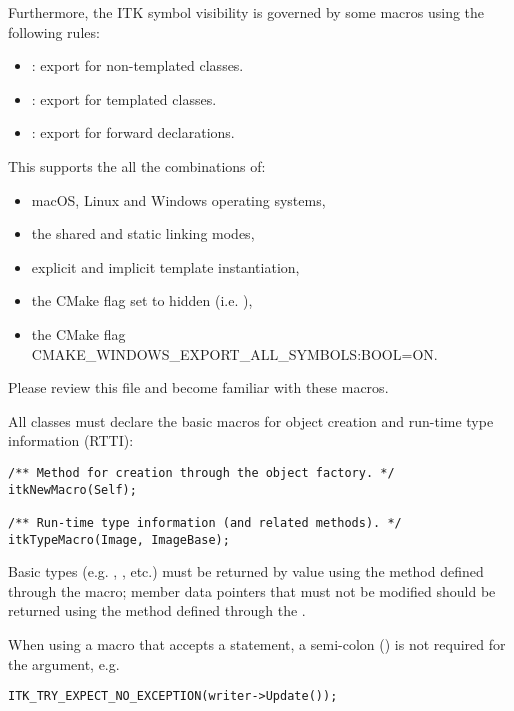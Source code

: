 Furthermore, the ITK symbol visibility is governed by some macros using the
following rules:
\begin{itemize}
\item {}: export for non-templated classes.
\item {}: export for templated classes.
\item {}: export for forward declarations.
\end{itemize}

This supports the all the combinations of:
\begin{itemize}
\item macOS, Linux and Windows operating systems,
\item the shared   and  static
linking modes,
\item explicit and implicit template instantiation,
\item the CMake  flag set to hidden (i.e.
),
\item the CMake flag {CMAKE\_WINDOWS\_EXPORT\_ALL\_SYMBOLS:BOOL=ON}.
\end{itemize}

Please review this file and become familiar with these macros.

All classes must declare the basic macros for object creation and run-time type
information (RTTI):

\small
\begin{verbatim}
/** Method for creation through the object factory. */
itkNewMacro(Self);

/** Run-time type information (and related methods). */
itkTypeMacro(Image, ImageBase);
\end{verbatim}
\normalsize

Basic types (e.g. , , etc.) must be returned by value
using the method defined through the  macro; member data
pointers that must not be modified should be returned using the method defined
through the .

When using a macro that accepts a statement, a semi-colon (\code{;}) is not
required for the argument, e.g.

\small
\begin{verbatim}
ITK_TRY_EXPECT_NO_EXCEPTION(writer->Update());
\end{verbatim}
\normalsize


